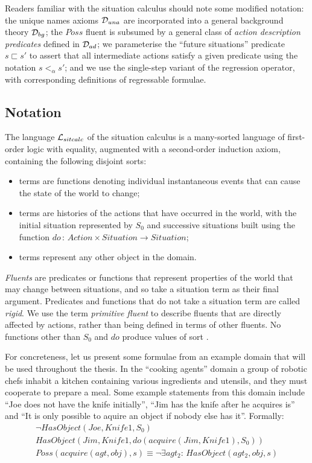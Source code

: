 Readers familiar with the situation calculus should note some modified
notation: the unique names axioms $\mathcal{D}_{una}$ are incorporated into
a general background theory $\mathcal{D}_{bg}$; the $Poss$ fluent is subsumed
by a general class of \emph{action description predicates} defined
in $\mathcal{D}_{ad}$; we parameterise the {}``future situations'' predicate
$s\sqsubset s'$ to assert that all intermediate actions satisfy a
given predicate using the notation $s<_{\alpha}s'$; and we use the
single-step variant of the regression operator, with corresponding
definitions of regressable formulae.


\subsection{Notation\label{sec:Background:SC:Notation}}

The language $\mathcal{L}_{sitcalc}$ of the situation calculus is a many-sorted language
of first-order logic with equality, augmented with a second-order
induction axiom, containing the following disjoint sorts:

\begin{itemize}
\item \emph{} terms are functions denoting individual instantaneous
events that can cause the state of the world to change; 
\item {} terms are histories of the actions that have occurred
in the world, with the initial situation represented by $S_{0}$ and
successive situations built using the function $do\,:\, Action\times Situation\rightarrow Situation$; 
\item {} terms represent any other object in the domain. 
\end{itemize}
\emph{Fluents} are predicates or functions that represent properties
of the world that may change between situations, and so take a situation
term as their final argument. Predicates and functions that do not
take a situation term are called \emph{rigid}. We use the term \emph{primitive
fluent} to describe fluents that are directly affected by actions,
rather than being defined in terms of other fluents. No functions
other than $S_{0}$ and $do$ produce values of sort .

For concreteness, let us present some formulae from an example domain
that will be used throughout the thesis. In the {}``cooking agents''
domain a group of robotic chefs inhabit a kitchen containing various
ingredients and utensils, and they must cooperate to prepare a meal.
Some example statements from this domain include {}``Joe does not
have the knife initially'', {}``Jim has the knife after he acquires
is'' and {}``It is only possible to aquire an object if nobody else
has it''. Formally:\begin{gather*}
\neg HasObject(Joe,Knife1,S_{0})\\
HasObject(Jim,Knife1,do(acquire(Jim,Knife1),S_{0}))\\
Poss(acquire(agt,obj),s)\equiv\neg\exists agt_{2}:\, HasObject(agt_{2},obj,s)\end{gather*}


